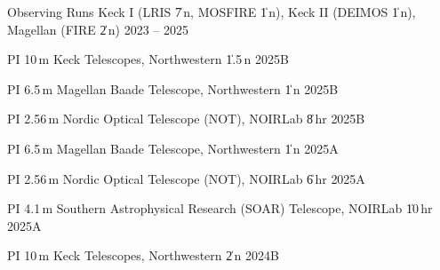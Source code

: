 \begin{cvpubs}

\end{cvpubs}





\begin{cventries}


\cvsimpentry
    {Observing Runs}
    {Keck I (LRIS \| 7\,n, MOSFIRE \| 1\,n), Keck II (DEIMOS \| 1\,n), Magellan (FIRE \| 2\,n)}
    {2023 -- 2025}
    {}

\cvsimpentry
    {PI}
    {10\,m Keck Telescopes, Northwestern \| 1.5\,n}
    {2025B}
    {}

\cvsimpentry
    {PI}
    {6.5\,m Magellan Baade Telescope, Northwestern \| 1\,n}
    {2025B}
    {}

\cvsimpentry
    {PI}
    {2.56\,m Nordic Optical Telescope (NOT), NOIRLab \| 8\,hr}
    {2025B}
    {}

\cvsimpentry
    {PI}
    {6.5\,m Magellan Baade Telescope, Northwestern \| 1\,n}
    {2025A}
    {}

\cvsimpentry
    {PI}
    {2.56\,m Nordic Optical Telescope (NOT), NOIRLab \| 6\,hr}
    {2025A}
    {}

\cvsimpentry
    {PI}
    {4.1\,m Southern Astrophysical Research (SOAR) Telescope, NOIRLab \| 10\,hr}
    {2025A}
    {}
    
\cvsimpentry
    {PI}
    {10\,m Keck Telescopes, Northwestern \| 2\,n}
    {2024B}
    {}







\end{cventries}